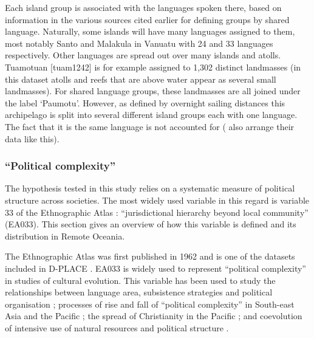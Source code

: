 \documentclass[a4paper,10pt]{article} %
\begin{document}

Each island group is associated with the languages spoken there, based on information in the various sources cited earlier for defining groups by shared language. Naturally, some islands will have many languages assigned to them, most notably Santo and Malakula in Vanuatu with 24 and 33 languages respectively. Other languages are spread out over many islands and atolls. Tuamotuan [tuam1242] is for example assigned to 1,302 distinct landmasses (in this dataset atolls and reefs that are above water appear as several small landmasses). For shared language groups, these landmasses are all joined under the label `Paumotu'. However, as defined by overnight sailing distances this archipelago is split into several different island groups each with one language. The fact that it is the same language is not accounted for (\citet{gavin2012island} also arrange their data like this).

\FloatBarrier
\subsubsection{``Political complexity''}
\label{appendix_def_pol_complex}
The hypothesis tested in this study relies on a systematic measure of political structure across societies. The most widely used variable in this regard is variable 33 of the Ethnographic Atlas \citep{EA_1971}: ``jurisdictional hierarchy beyond local community'' (EA033). This section gives an overview of how this variable is defined and its distribution in Remote Oceania. 

The Ethnographic Atlas was first published in 1962 and is one of the datasets included in D-PLACE \citep{d_place_all}. EA033 is widely used to represent ``political complexity'' in studies of cultural evolution. This variable has been used to study the relationships between language area, subsistence strategies and political organisation \citep{curriemace2009}; processes of rise and fall of ``political complexity'' in South-east Asia and the Pacific \citep{currie2010rise}; the spread of Christianity in the Pacific \citep{watts_2018}; and coevolution of intensive use of natural resources and political structure \citep{sheehan2018coevolution}.  
\end{document}
